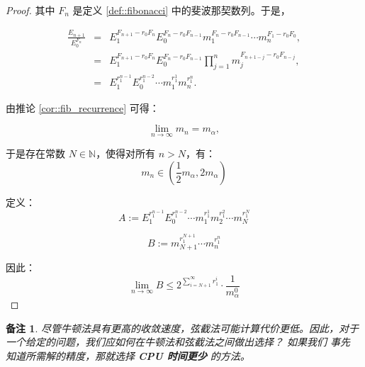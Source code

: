 \documentclass[a4paper]{ctexart}
\newtheorem{remark}{备注}
\numberwithin{theorem}{section}
\numberwithin{equation}{section}
\numberwithin{figure}{section}
\numberwithin{remark}{section}
\begin{document}
\begin{proof}
其中 \( F_n \) 是定义 \ref{def::fibonacci} 中的斐波那契数列。于是，

\begin{equation}
    \begin{array}{rcl}
\frac{E_{n+1}}{E_0^{F_n}} &=& E_1^{F_{n+1} - r_0 F_n} E_0^{F_n - r_0 F_{n-1}} m_1^{F_n - r_0 F_{n-1}} \cdots m_n^{F_1 - r_0 F_0}, \\
&=& E_1^{F_{n+1} - r_0 F_n} E_0^{F_n - r_0 F_{n-1}} \prod_{j=1}^n m_j^{F_{n+1-j} - r_0 F_{n-j}}, \\
&=& E_1^{r_1^{n-1}} E_0^{r_1^{n-2}} \cdots m_1^{r_1^1} m_n^{r_1^n}.
    \end{array}
\end{equation}

由推论 \ref{cor::fib_recurrence} 可得：


\begin{equation}
\lim_{n \to \infty} m_n = m_\alpha,
\end{equation}

于是存在常数 \( N \in \mathbb{N} \)，使得对所有 \( n > N \)，有：
\begin{equation}
m_n \in \left( \frac{1}{2} m_\alpha, 2m_\alpha \right)
\end{equation}

定义：
\begin{equation*}
A := E_1^{r_1^{n-1}} E_0^{r_1^{n-2}} \cdots m_1^{r_1^1} m_2^{r_1^2} \cdots m_{N}^{r_1^N}
\end{equation*}

\begin{equation*}
B := m_{N+1}^{r_1^{N+1}} \cdots m_n^{r_1^n}
\end{equation*}

因此：
\begin{equation*}
\lim_{n \to \infty} B \leq 2^{\sum_{i=N+1}^{\infty} r_1^i} \cdot \frac{1}{m_\alpha^0}
\end{equation*}
\end{proof}

\begin{remark}
尽管牛顿法具有更高的收敛速度，弦截法可能计算代价更低。因此，对于一个给定的问题，我们应如何在牛顿法和弦截法之间做出选择？
如果我们 \textit{事先} 知道所需解的精度，那就选择 \textbf{CPU 时间更少} 的方法。
\end{remark}
\end{document}
